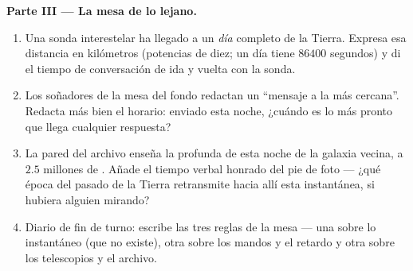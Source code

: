\begin{problem}
\medskip\noindent\textbf{Parte III --- La mesa de lo lejano.}
\begin{enumerate}[resume]
  \item Una sonda interestelar ha llegado a un \emph{día} 
        completo de la Tierra. Expresa esa distancia en kilómetros
        (potencias de diez; un día tiene $86400$ segundos) y di el
        tiempo de conversación de ida y vuelta con la sonda.
  \item Los soñadores de la mesa del fondo redactan un ``mensaje a
        la  más cercana''. Redacta más bien el horario:
        enviado esta noche, ¿cuándo es lo más pronto que llega
        cualquier respuesta?
  \item La pared del archivo enseña la  profunda de esta
        noche de la galaxia vecina, a $2.5$ millones de
        . Añade el tiempo verbal honrado del pie de
        foto --- ¿qué época del pasado de la Tierra retransmite hacia
        allí esta instantánea, si hubiera alguien mirando?
  \item Diario de fin de turno: escribe las tres reglas de la mesa
        --- una sobre lo instantáneo (que no existe), otra sobre los
        mandos y el retardo y otra sobre los telescopios y el
        archivo.
\end{enumerate}
\end{problem}
